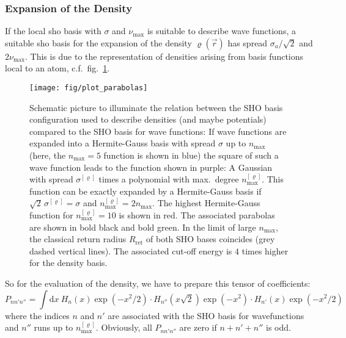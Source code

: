 \documentclass[oribibl]{llncs}
\newcommand{\um}[1]{_{\mathrm{#1}}}
\begin{document}
\subsubsection{Expansion of the Density}
If the local \ac{sho} basis with $\sigma$ and $\nu\um{max}$
is suitable to describe wave functions, 
a suitable \ac{sho} basis for the expansion of the density $\varrho(\vec r)$ has
spread $\sigma_a/\sqrt{2}$ and $2\nu\um{max}$.
This is due to the representation of densities
arising from basis functions local to an atom, c.f.~fig.~\ref{fig:plot_parabolas}.
%
\begin{figure}
  \begin{minipage}[c]{.990\textwidth}
	\texttt{[image: fig/plot\_parabolas]} %
  \end{minipage}\hfill
  \begin{minipage}[c]{.009\textwidth}
  \end{minipage}
  \label{fig:plot_parabolas}
  \caption{
Schematic picture to illuminate the relation between the SHO basis configuration 
used to describe densities (and maybe potentials)
compared to the SHO basis for wave functions:
If wave functions are expanded into a Hermite-Gauss basis with spread $\sigma$
up to $n\um{max}$ (here, the $n\um{max} = 5$ function is shown in blue)
the square of such a wave function leads to the function shown in purple:
A Gaussian with spread $\sigma^{[\varrho]}$ times a polynomial with max.~degree $n\um{max}^{[\varrho]}$.
This function can be exactly expanded by a Hermite-Gauss basis if
$\sqrt{2}\,\sigma^{[\varrho]} = \sigma$
and
$n\um{max}^{[\varrho]} = 2n\um{max}$.
The highest Hermite-Gauss function for $n\um{max}^{[\varrho]} = 10$ is shown in red.
The associated parabolas are shown in bold black and bold green.
In the limit of large $n\um{max}$, the classical return radius $R\um{ret}$
of both SHO bases coincides (grey dashed vertical lines).
The associated cut-off energy is $4$ times higher for the density basis.
  }
\end{figure}
%
%

So for the evaluation of the density,
we have to prepare this tensor of coefficients:
\begin{equation}
	P_{nn'n''} = \int \mathrm d x \ H_{n}(x) \exp(-x^2/2) \cdot H_{n''}(x\sqrt{2}) \exp(-x^2) \cdot H_{n'}(x) \exp(-x^2/2)
\end{equation}
where the indices $n$ and $n'$ are associated with the SHO basis for wavefunctions
and $n''$ runs up to $n\um{max}^{[\varrho]}$. 
Obviously, all $P_{nn'n''}$ are zero if $n + n' + n''$ is odd.
\end{document}
